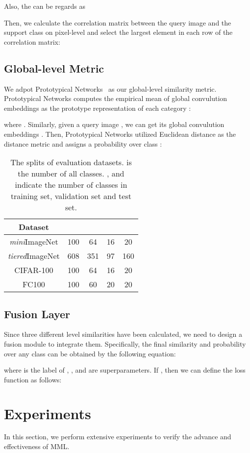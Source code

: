 \documentclass{article}
\begin{document}
Also, the  can be regards as 

Then, we calculate the correlation matrix   between the query image and the support class on pixel-level and select the largest element in each row of the correlation matrix:


\subsection{Global-level Metric}
We adpot Prototypical Networks~\cite{snell2017prototypical} as our global-level similarity metric. Prototypical Networks computes the empirical mean of global convulution embeddings as the prototype representation of each category :

where . Similarly, given a query image , we can get its global convulution embeddings .
Then, Prototypical Networks utilized Euclidean distance as the distance metric and assigns a probability over class :


\begin{table}[t]
	\centering
	\begin{tabular}{ccccc}
		\toprule
		\textbf{Dataset} &\textbf{}&\textbf{}&\textbf{}&\textbf{}
		\\
		\midrule
		\emph{mini}ImageNet&100&64&16&20\\
		\emph{tiered}ImageNet&608&351&97&160\\
		CIFAR-100&100&64&16&20\\		
		FC100&100&60&20&20\\
		\bottomrule
	\end{tabular}	
	\caption{The splits of evaluation datasets.  is the number of all classes. ,  and  indicate the number of classes in training set, validation set and test set.}
\end{table}

\subsection{Fusion Layer}
Since three different level similarities have been calculated, we need to design a fusion module to integrate them. Specifically, the final similarity and probability over any class  can be obtained by the following equation: 

where  is the label of , ,  and  are superparameters. If , then we can define the loss function as follows:


\section{Experiments}
In this section, we perform extensive experiments to verify the advance and effectiveness of MML. 
\end{document}
